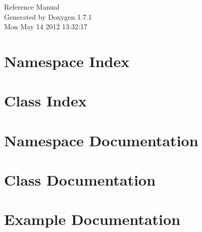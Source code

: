 \documentclass[a4paper]{book}
\begin{document}
\hypersetup{pageanchor=false}
\begin{titlepage}
\vspace*{7cm}
\begin{center}
{\Large Reference Manual}\\
\vspace*{1cm}
{\large Generated by Doxygen 1.7.1}\\
\vspace*{0.5cm}
{\small Mon May 14 2012 13:32:17}\\
\end{center}
\end{titlepage}
\clearemptydoublepage
{}
\tableofcontents
\clearemptydoublepage
{}
\hypersetup{pageanchor=true}
\chapter{Namespace Index}

\chapter{Class Index}

\chapter{Namespace Documentation}



\chapter{Class Documentation}










\chapter{Example Documentation}

\printindex
\end{document}
